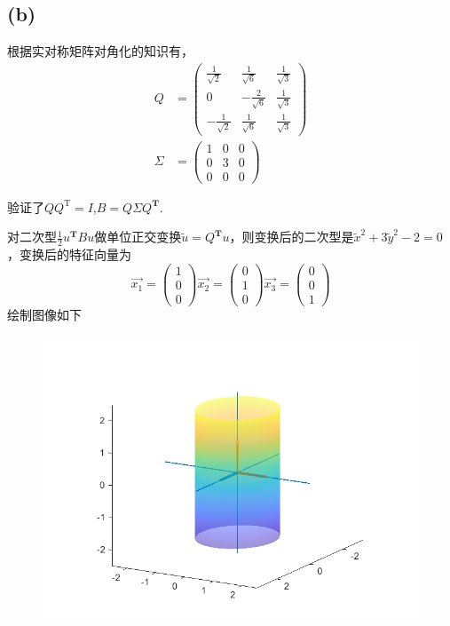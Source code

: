 \documentclass[UTF8]{ctexart}
\begin{document}
\subsection*{(b)}
根据实对称矩阵对角化的知识有，\begin{equation*}
    \begin{aligned}
        Q&=\begin{pmatrix}
            \frac{1}{\sqrt{2}}&\frac{1}{\sqrt{6}}&\frac{1}{\sqrt{3}}\\
            0&-\frac{2}{\sqrt{6}}&\frac{1}{\sqrt{3}}\\
            -\frac{1}{\sqrt{2}}&\frac{1}{\sqrt{6}}&\frac{1}{\sqrt{3}}
        \end{pmatrix}\\
        \Sigma&=\begin{pmatrix}
            1&0&0\\
            0&3&0\\
            0&0&0
        \end{pmatrix}
    \end{aligned}
\end{equation*}

验证了$QQ^{\mathrm{T}}=I$,$B=Q\Sigma Q^\mathbf{T}$.

对二次型$\frac{1}{2}u^\mathbf{T}Bu$做单位正交变换$\tilde{u}=Q^\mathbf{T}u$，则变换后的二次型是$\tilde{x}^2+3\tilde{y}^2-2=0$，变换后的特征向量为\begin{equation*}
    \vec{x_1}=\begin{pmatrix}
        1\\0\\0
    \end{pmatrix}
    \vec{x_2}=\begin{pmatrix}
        0\\1\\0
    \end{pmatrix}
    \vec{x_3}=\begin{pmatrix}
        0\\0\\1
    \end{pmatrix}
\end{equation*}
 绘制图像如下\begin{figure}[hp]
    \centering
    \includegraphics*[scale=0.3]{pic4_2.png}
 \end{figure}
\end{document}
